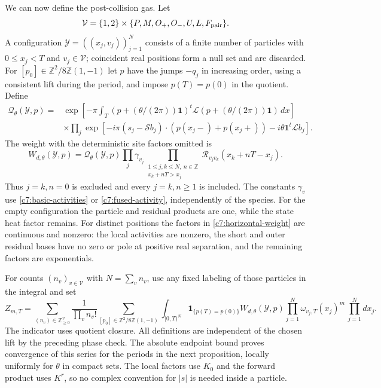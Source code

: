 We can now define the post-collision gas.  Let
\[
\mathcal V=\{1,2\}\times\{P,M,O_+,O_-,U,L,F_{\rm pair}\}.
\]
A configuration $\mathcal Y=((x_j,v_j))_{j=1}^N$ consists of a finite number
of particles with $0\le x_j<T$ and $v_j\in\mathcal V$; coincident real
positions form a null set and are discarded.  For
$[p_0]\in\mathbb Z^2/8\mathbb Z(1,-1)$ let $p$ have the jumps $-q_j$ in
increasing order, using a consistent lift during the period, and impose
$p(T)=p(0)$ in the quotient.  Define
\begin{equation}\label{c7:state-weight}
\begin{split}
\mathcal Q_\theta(\mathcal Y,p)={}&
\exp\!\left[-\pi\int_T
 (p+(\theta/(2\pi))\mathbf1)^t\mathcal L
 (p+(\theta/(2\pi))\mathbf1)\,dx\right]\\
&\times\prod_j\exp\!\left[
-i\pi(s_j-\mathcal S b_j)\cdot(p(x_j-)+p(x_j+))
-i\theta\mathbf1^t\mathcal L b_j\right].
\end{split}
\end{equation}
The weight with the deterministic site factors omitted is
\begin{equation}\label{c7:horizontal-weight}
W_{d,\theta}(\mathcal Y,p)=\mathcal Q_\theta(\mathcal Y,p)
 \prod_j\gamma_{v_j}
 \prod_{\substack{1\le j,k\le N,\ n\in\mathbb Z\\x_k+nT>x_j}}
 \mathscr R_{v_jv_k}(x_k+nT-x_j).
\end{equation}
Thus $j=k,n=0$ is excluded and every
$j=k,n\ge1$ is included.  The constants $\gamma_v$ use
\eqref{c7:basic-activities} or \eqref{c7:fused-activity}, independently of
the species.  For the empty configuration the particle and residual products
are one, while the state heat factor remains.
For distinct positions the factors in \eqref{c7:horizontal-weight} are
continuous and nonzero: the local activities are nonzero, the short and
outer residual bases have no zero or pole at positive real separation, and
the remaining factors are exponentials.

For counts $(n_v)_{v\in\mathcal V}$ with $N=\sum_vn_v$, use any fixed
labeling of those particles in the integral and set
\begin{equation}\label{c7:gas-definition}
Z_{m,T}=\sum_{(n_v)\in\mathbb Z_{\ge0}^{\mathcal V}}
 \frac1{\prod_v n_v!}
 \sum_{[p_0]\in\mathbb Z^2/8\mathbb Z(1,-1)}
 \int_{[0,T)^N}\!\mathbf1_{\{p(T)=p(0)\}}
 W_{d,\theta}(\mathcal Y,p)
 \prod_{j=1}^N\omega_{v_j,T}(x_j)^m\,\prod_{j=1}^Ndx_j.
\end{equation}
The indicator uses quotient closure.  All definitions are independent of
the chosen lift by the preceding phase check.  The absolute endpoint bound
proves convergence of this series for the periods in the next proposition,
locally uniformly for $\theta$ in compact sets.  The local factors use
$K_0$ and the forward product uses $K^r$, so no complex convention for
$|s|$ is needed inside a particle.

